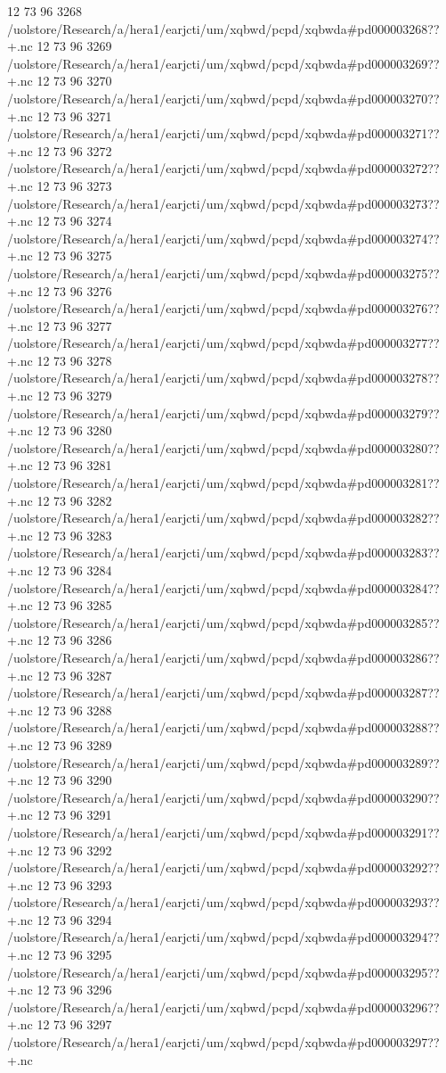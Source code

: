 12 73 96
3268
/uolstore/Research/a/hera1/earjcti/um/xqbwd/pcpd/xqbwda#pd000003268??+.nc
12 73 96
3269
/uolstore/Research/a/hera1/earjcti/um/xqbwd/pcpd/xqbwda#pd000003269??+.nc
12 73 96
3270
/uolstore/Research/a/hera1/earjcti/um/xqbwd/pcpd/xqbwda#pd000003270??+.nc
12 73 96
3271
/uolstore/Research/a/hera1/earjcti/um/xqbwd/pcpd/xqbwda#pd000003271??+.nc
12 73 96
3272
/uolstore/Research/a/hera1/earjcti/um/xqbwd/pcpd/xqbwda#pd000003272??+.nc
12 73 96
3273
/uolstore/Research/a/hera1/earjcti/um/xqbwd/pcpd/xqbwda#pd000003273??+.nc
12 73 96
3274
/uolstore/Research/a/hera1/earjcti/um/xqbwd/pcpd/xqbwda#pd000003274??+.nc
12 73 96
3275
/uolstore/Research/a/hera1/earjcti/um/xqbwd/pcpd/xqbwda#pd000003275??+.nc
12 73 96
3276
/uolstore/Research/a/hera1/earjcti/um/xqbwd/pcpd/xqbwda#pd000003276??+.nc
12 73 96
3277
/uolstore/Research/a/hera1/earjcti/um/xqbwd/pcpd/xqbwda#pd000003277??+.nc
12 73 96
3278
/uolstore/Research/a/hera1/earjcti/um/xqbwd/pcpd/xqbwda#pd000003278??+.nc
12 73 96
3279
/uolstore/Research/a/hera1/earjcti/um/xqbwd/pcpd/xqbwda#pd000003279??+.nc
12 73 96
3280
/uolstore/Research/a/hera1/earjcti/um/xqbwd/pcpd/xqbwda#pd000003280??+.nc
12 73 96
3281
/uolstore/Research/a/hera1/earjcti/um/xqbwd/pcpd/xqbwda#pd000003281??+.nc
12 73 96
3282
/uolstore/Research/a/hera1/earjcti/um/xqbwd/pcpd/xqbwda#pd000003282??+.nc
12 73 96
3283
/uolstore/Research/a/hera1/earjcti/um/xqbwd/pcpd/xqbwda#pd000003283??+.nc
12 73 96
3284
/uolstore/Research/a/hera1/earjcti/um/xqbwd/pcpd/xqbwda#pd000003284??+.nc
12 73 96
3285
/uolstore/Research/a/hera1/earjcti/um/xqbwd/pcpd/xqbwda#pd000003285??+.nc
12 73 96
3286
/uolstore/Research/a/hera1/earjcti/um/xqbwd/pcpd/xqbwda#pd000003286??+.nc
12 73 96
3287
/uolstore/Research/a/hera1/earjcti/um/xqbwd/pcpd/xqbwda#pd000003287??+.nc
12 73 96
3288
/uolstore/Research/a/hera1/earjcti/um/xqbwd/pcpd/xqbwda#pd000003288??+.nc
12 73 96
3289
/uolstore/Research/a/hera1/earjcti/um/xqbwd/pcpd/xqbwda#pd000003289??+.nc
12 73 96
3290
/uolstore/Research/a/hera1/earjcti/um/xqbwd/pcpd/xqbwda#pd000003290??+.nc
12 73 96
3291
/uolstore/Research/a/hera1/earjcti/um/xqbwd/pcpd/xqbwda#pd000003291??+.nc
12 73 96
3292
/uolstore/Research/a/hera1/earjcti/um/xqbwd/pcpd/xqbwda#pd000003292??+.nc
12 73 96
3293
/uolstore/Research/a/hera1/earjcti/um/xqbwd/pcpd/xqbwda#pd000003293??+.nc
12 73 96
3294
/uolstore/Research/a/hera1/earjcti/um/xqbwd/pcpd/xqbwda#pd000003294??+.nc
12 73 96
3295
/uolstore/Research/a/hera1/earjcti/um/xqbwd/pcpd/xqbwda#pd000003295??+.nc
12 73 96
3296
/uolstore/Research/a/hera1/earjcti/um/xqbwd/pcpd/xqbwda#pd000003296??+.nc
12 73 96
3297
/uolstore/Research/a/hera1/earjcti/um/xqbwd/pcpd/xqbwda#pd000003297??+.nc
